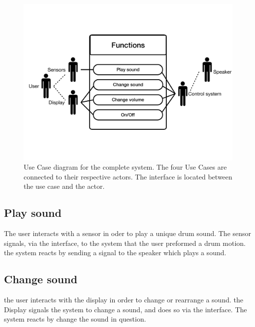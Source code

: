 \begin{figure}[H]
\centering
\includegraphics[scale=0.4]{Figure/protoUseCase01.pdf}
\caption{
Use Case diagram for the complete system. The four Use Cases are connected to their respective actors. The interface is located between the use case and the actor.}
\label{fig:protoUseCase}
\end{figure}

\subsection{Play sound}
The user interacts with a sensor in oder to play a unique drum sound. The sensor signals, via the interface, to the system that the user preformed a drum motion. the system reacts by sending a signal to the speaker which plays a sound.

\subsection{Change sound}
the user interacts with the display in order to change or rearrange a sound. the Display signals the system to change a sound, and does so via the interface. The system reacts by change the sound in question.


